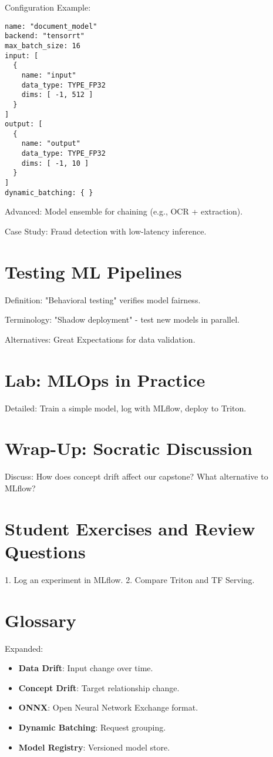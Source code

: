 \documentclass[11pt]{article}
\begin{document}
Configuration Example:
\lstset{language=yaml}
\begin{lstlisting}
name: "document_model"
backend: "tensorrt"
max_batch_size: 16
input: [
  {
    name: "input"
    data_type: TYPE_FP32
    dims: [ -1, 512 ]
  }
]
output: [
  {
    name: "output"
    data_type: TYPE_FP32
    dims: [ -1, 10 ]
  }
]
dynamic_batching: { }
\end{lstlisting}

Advanced: Model ensemble for chaining (e.g., OCR + extraction).

Case Study: Fraud detection with low-latency inference.

\section{Testing ML Pipelines}
Definition: "Behavioral testing" verifies model fairness.

Terminology: "Shadow deployment" - test new models in parallel.

Alternatives: Great Expectations for data validation.

\section{Lab: MLOps in Practice}
Detailed: Train a simple model, log with MLflow, deploy to Triton.

\section{Wrap-Up: Socratic Discussion}
Discuss: How does concept drift affect our capstone? What alternative to MLflow?

\section{Student Exercises and Review Questions}
1. Log an experiment in MLflow.
2. Compare Triton and TF Serving.

\section{Glossary}
Expanded:
\begin{itemize}
    \item \textbf{Data Drift}: Input change over time.
    \item \textbf{Concept Drift}: Target relationship change.
    \item \textbf{ONNX}: Open Neural Network Exchange format.
    \item \textbf{Dynamic Batching}: Request grouping.
    \item \textbf{Model Registry}: Versioned model store.
\end{itemize}
\end{document}

